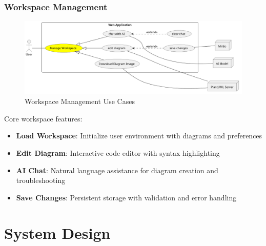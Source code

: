 \subsubsection{Workspace Management}
\begin{figure}[H]
\centering
\includegraphics[width=1\textwidth]{conception/SprintIV/use_case_diagrams/refined_use_case_feature_workspace_management.png}
\caption{Workspace Management Use Cases}
\end{figure}

Core workspace features:
\begin{itemize}
    \item \textbf{Load Workspace}: Initialize user environment with diagrams and preferences
    \item \textbf{Edit Diagram}: Interactive code editor with syntax highlighting
    \item \textbf{AI Chat}: Natural language assistance for diagram creation and troubleshooting
    \item \textbf{Save Changes}: Persistent storage with validation and error handling
\end{itemize}

\section{System Design}

